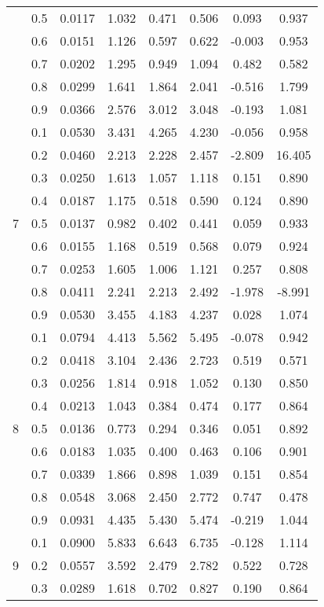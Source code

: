 \documentclass[11pt,a4paper]{report}
\begin{document}
\begin{longtable}{ | c | c || c | c | c | c | c | c | }
 & 0.5 & 0.0117 & 1.032 & 0.471 & 0.506 & 0.093 & 0.937 \\
 & 0.6 & 0.0151 & 1.126 & 0.597 & 0.622 & -0.003 & 0.953 \\
 & 0.7 & 0.0202 & 1.295 & 0.949 & 1.094 & 0.482 & 0.582 \\
 & 0.8 & 0.0299 & 1.641 & 1.864 & 2.041 & -0.516 & 1.799 \\
 & 0.9 & 0.0366 & 2.576 & 3.012 & 3.048 & -0.193 & 1.081 \\
 \hline
\multirow{9}{*}{7} & 0.1 & 0.0530 & 3.431 & 4.265 & 4.230 & -0.056 & 0.958 \\
 & 0.2 & 0.0460 & 2.213 & 2.228 & 2.457 & -2.809 & 16.405 \\
 & 0.3 & 0.0250 & 1.613 & 1.057 & 1.118 & 0.151 & 0.890 \\
 & 0.4 & 0.0187 & 1.175 & 0.518 & 0.590 & 0.124 & 0.890 \\
 & 0.5 & 0.0137 & 0.982 & 0.402 & 0.441 & 0.059 & 0.933 \\
 & 0.6 & 0.0155 & 1.168 & 0.519 & 0.568 & 0.079 & 0.924 \\
 & 0.7 & 0.0253 & 1.605 & 1.006 & 1.121 & 0.257 & 0.808 \\
 & 0.8 & 0.0411 & 2.241 & 2.213 & 2.492 & -1.978 & -8.991 \\
 & 0.9 & 0.0530 & 3.455 & 4.183 & 4.237 & 0.028 & 1.074 \\
 \hline
\multirow{9}{*}{8} & 0.1 & 0.0794 & 4.413 & 5.562 & 5.495 & -0.078 & 0.942 \\
 & 0.2 & 0.0418 & 3.104 & 2.436 & 2.723 & 0.519 & 0.571 \\
 & 0.3 & 0.0256 & 1.814 & 0.918 & 1.052 & 0.130 & 0.850 \\
 & 0.4 & 0.0213 & 1.043 & 0.384 & 0.474 & 0.177 & 0.864 \\
 & 0.5 & 0.0136 & 0.773 & 0.294 & 0.346 & 0.051 & 0.892 \\
 & 0.6 & 0.0183 & 1.035 & 0.400 & 0.463 & 0.106 & 0.901 \\
 & 0.7 & 0.0339 & 1.866 & 0.898 & 1.039 & 0.151 & 0.854 \\
 & 0.8 & 0.0548 & 3.068 & 2.450 & 2.772 & 0.747 & 0.478 \\
 & 0.9 & 0.0931 & 4.435 & 5.430 & 5.474 & -0.219 & 1.044 \\
 \hline
\multirow{9}{*}{9} & 0.1 & 0.0900 & 5.833 & 6.643 & 6.735 & -0.128 & 1.114 \\
 & 0.2 & 0.0557 & 3.592 & 2.479 & 2.782 & 0.522 & 0.728 \\
 & 0.3 & 0.0289 & 1.618 & 0.702 & 0.827 & 0.190 & 0.864 \\

\end{longtable}
\end{document}
